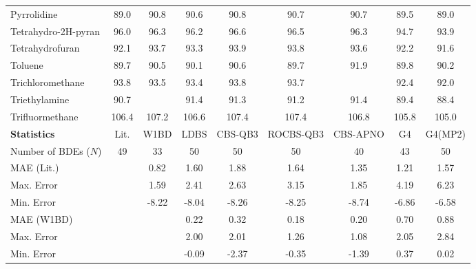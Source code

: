 \begin{longtable}{m{3.1cm} | c c c c c c c c}
Pyrrolidine                      &  89.0     &   90.8   &   90.6   &    90.8     &    90.7    &   90.7   &  89.5   &    89.0   \\
Tetrahydro-2H-pyran              &  96.0     &   96.3   &   96.2   &    96.6     &    96.5    &   96.3   &  94.7   &    93.9   \\
Tetrahydrofuran                  &  92.1     &   93.7   &   93.3   &    93.9     &    93.8    &   93.6   &  92.2   &    91.6   \\
Toluene                          &  89.7     &   90.5   &   90.1   &    90.6     &    89.7    &   91.9   &  89.8   &    90.2   \\
Trichloromethane                 &  93.8     &   93.5   &   93.4   &    93.8     &    93.7    &          &  92.4   &    92.0   \\
Triethylamine                    &  90.7     &          &   91.4   &    91.3     &    91.2    &   91.4   &  89.4   &    88.4   \\
Trifluormethane                  & 106.4     &  107.2   &  106.6   &   107.4     &   107.4    &  106.8   & 105.8   &   105.0   \\
\hline
\textbf{Statistics}             & Lit.       &  W1BD    &    LDBS  &    CBS-QB3  &  ROCBS-QB3  &  CBS-APNO &    G4  &    G4(MP2)\\
\hline
Number of BDEs ($N$) &    49     &     33   &     50   &      50     &      50     &     40    &    43   &     50   \\
MAE (Lit.)                       &           &   0.82   &   1.60   &    1.88     &    1.64     &   1.35    &  1.21   &   1.57   \\
Max. Error                             &           &   1.59   &   2.41   &    2.63     &    3.15     &   1.85    &  4.19   &   6.23   \\
Min. Error                           &           &  -8.22   &  -8.04   &   -8.26     &   -8.25     &  -8.74    & -6.86   &  -6.58   \\
MAE (W1BD)                       &           &          &   0.22   &    0.32     &    0.18     &   0.20    &  0.70   &   0.88   \\
Max. Error                            &           &          &   2.00   &    2.01     &    1.26     &   1.08    &  2.05   &   2.84   \\
Min. Error                            &           &          &  -0.09   &   -2.37     &   -0.35     &  -1.39    &  0.37   &   0.02   \\
\end{longtable}
